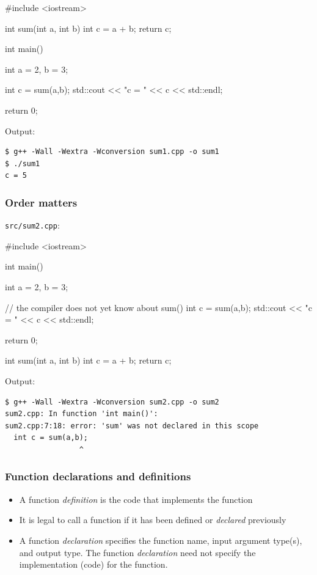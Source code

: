 \documentclass[12pt,letterpaper,twoside]{article}
\begin{document}
\begin{cpp}
#include <iostream>

int sum(int a, int b) {
  int c = a + b;
  return c;
}

int main() {
  int a = 2, b = 3;

  int c = sum(a,b);
  std::cout << "c = " << c << std::endl;

  return 0;
}
\end{cpp}

Output:

\begin{verbatim}
$ g++ -Wall -Wextra -Wconversion sum1.cpp -o sum1
$ ./sum1
c = 5
\end{verbatim}

\subsubsection{Order matters}
\texttt{src/sum2.cpp}:

\begin{cpp}
#include <iostream>

int main() {
  int a = 2, b = 3;

  // the compiler does not yet know about sum()
  int c = sum(a,b);
  std::cout << "c = " << c << std::endl;

  return 0;
}

int sum(int a, int b) {
  int c = a + b;
  return c;
}
\end{cpp}

Output:

\begin{verbatim}
$ g++ -Wall -Wextra -Wconversion sum2.cpp -o sum2
sum2.cpp: In function 'int main()':
sum2.cpp:7:18: error: 'sum' was not declared in this scope
  int c = sum(a,b);
                 ^
\end{verbatim}

\subsubsection{Function declarations and definitions}
\begin{itemize}
\item
  A function \emph{definition} is the code that implements the function
\item
  It is legal to call a function if it has been defined or
  \emph{declared} previously
\item
  A function \emph{declaration} specifies the function name, input
  argument type(s), and output type. The function \emph{declaration}
  need not specify the implementation (code) for the function.
\end{itemize}
\end{document}
